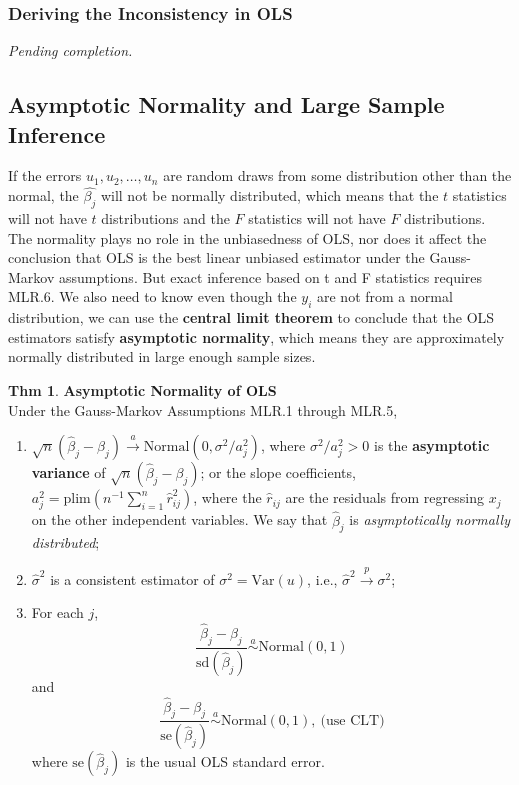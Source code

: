 \documentclass[a4paper, 10pt]{article}
\theoremstyle{definition}	%
\newtheorem{theorem}{Thm}
\begin{document}
\subsubsection{Deriving the Inconsistency in OLS}
\textit{Pending completion.}

\subsection{Asymptotic Normality and Large Sample Inference}
If the errors $u_1, u_2,\ldots , u_n$ are random draws from some distribution
other than the normal, the $\hat{\beta_j}$ will not be normally distributed, which means that the $t$ statistics will not have $t$ distributions and the $F$ statistics will not have $F$ distributions.\\
The normality plays no role in the unbiasedness of OLS, nor does it affect the conclusion that OLS is the best linear unbiased estimator under the Gauss-Markov assumptions. But exact inference based on t and F statistics requires MLR.6. We also need to know even though the $y_i$ are not from a normal distribution, we can use the \textbf{central limit theorem} to conclude that the OLS estimators satisfy \textbf{asymptotic normality}, which means they are approximately normally distributed in large enough sample sizes.
\begin{theorem}
    \textbf{Asymptotic Normality of OLS}\\
    Under the Gauss-Markov Assumptions MLR.1 through MLR.5,
    \begin{enumerate}
    \item[(i)] $\sqrt{n}(\hat{\beta}_j - \beta_j) \xrightarrow{a} \text{Normal}(0, \sigma^2 / a_j^2)$, where $\sigma^2 / a_j^2 > 0$ is the \textbf{asymptotic variance} of $\sqrt{n}(\hat{\beta}_j - \beta_j)$; or the slope coefficients, $a_j^2 = \text{plim}\left(n^{-1} \sum_{i=1}^n \hat{r}_{ij}^2 \right)$, where the $\hat{r}_{ij}$ are the residuals from regressing $x_j$ on the other independent variables. 
    We say that $\hat{\beta}_j$ is \textit{asymptotically normally distributed};
    \item[(ii)] $\hat{\sigma}^2$ is a consistent estimator of $\sigma^2 = \text{Var}(u)$,
    i.e., $\hat{\sigma}^2 \xrightarrow{p} \sigma^2$;
    \item[(iii)] For each $j$,
\begin{equation*}
    \frac{\hat{\beta}_j - \beta_j}{\text{sd}(\hat{\beta}_j)} \overset{a}{\sim} \text{Normal}(0, 1)
\end{equation*}
    and
\begin{equation}
        \frac{\hat{\beta}_j - \beta_j}{\text{se}(\hat{\beta}_j)} \overset{a}{\sim} \text{Normal}(0, 1), \ \text{(use CLT)} \label{eq:p.170,5.7}
\end{equation}
    where $\text{se}(\hat{\beta}_j)$ is the usual OLS standard error.
\end{enumerate}
\end{theorem}
\end{document}
